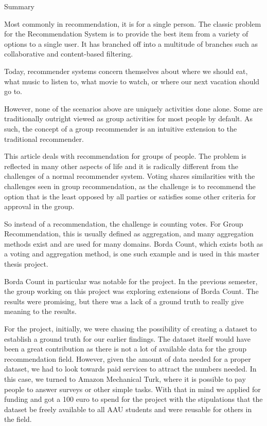 \begin{titlepage}
\begin{adjustwidth*}{1.9cm}{1.9cm}
\Huge
\begin{center}
Summary
\end{center}
\vspace{.6cm}
\normalsize
Most commonly in recommendation, it is for a single person. The classic problem for the Recommendation System is to provide the best item from a variety of options to a single user. It has branched off into a multitude of branches such as collaborative and content-based filtering.

Today, recommender systems concern themselves about where we should eat, what music to listen to, what movie to watch, or where our next vacation should go to.

However, none of the scenarios above are uniquely activities done alone. Some are traditionally outright viewed as group activities for most people by default. As such, the concept of a group recommender is an intuitive extension to the traditional recommender.

This article deals with recommendation for groups of people. The problem is reflected in many other aspects of life and it is radically different from the challenges of a normal recommender system. Voting shares similarities with the challenges seen in group recommendation, as the challenge is to recommend the option that is the least opposed by all parties or satisfies some other criteria for approval in the group.

So instead of a recommendation, the challenge is counting votes. For Group Recommendation, this is usually defined as aggregation, and many aggregation methods exist and are used for many domains. Borda Count, which exists both as a voting and aggregation method, is one such example and is used in this master thesis project.

Borda Count in particular was notable for the project. In the previous semester, the group working on this project was exploring extensions of Borda Count. The results were promising, but there was a lack of a ground truth to really give meaning to the results.

For the project, initially, we were chasing the possibility of creating a dataset to establish a ground truth for our earlier findings. The dataset itself would have been a great contribution as there is not a lot of available data for the group recommendation field. However, given the amount of data needed for a proper dataset, we had to look towards paid services to attract the numbers needed. In this case, we turned to Amazon Mechanical Turk, where it is possible to pay people to answer surveys or other simple tasks. With that in mind we applied for funding and got a 100 euro to spend for the project with the stipulations that the dataset be freely available to all AAU students and were reusable for others in the field.


\end{adjustwidth*}
\end{titlepage}
